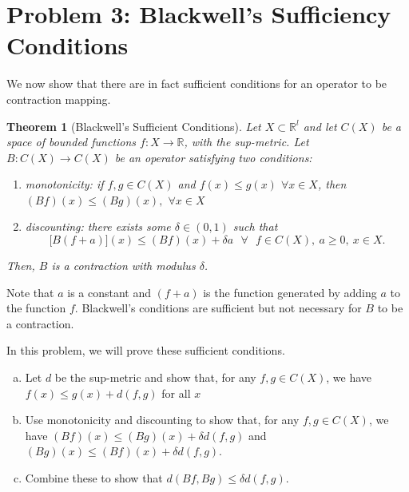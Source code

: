 \documentclass[11pt]{extarticle}
\theoremstyle{plain}
\newtheorem{thm}{Theorem}
\theoremstyle{definition}
\begin{document}
\vspace{5mm}
\section*{Problem 3: Blackwell's Sufficiency Conditions}

We now show that there are in fact sufficient conditions for an operator to be contraction mapping.

\begin{thm}[Blackwell's Sufficient Conditions]
	
	Let $X \subset \mathbb R^l$ and let $C(X)$ be a space of bounded functions $f:X \to \mathbb R$, with the sup-metric. Let $B : C(X) \to C(X)$ be an operator satisfying two conditions:
	\begin{enumerate}[1.]
		\item monotonicity: if $f,g\in C(X)$ and $f(x)\leq g(x)$ $\forall x\in X$,%
		\newline
		then $(Bf)(x)\leq (Bg)(x),$ $\forall x\in X$\newline
		
		\item discounting: there exists some $\delta \in (0,1)$ such that 
		\[
		\lbrack B(f+a)](x)\leq (Bf)(x)+\delta a\text{ \ }\forall \text{ }f\in C(X),\
		a\geq 0,\ x\in X. 
		\]%
	\end{enumerate}
	
	\noindent
	Then, $B$ is a contraction with modulus $\delta$.

\end{thm}

\noindent
Note that $a$ is a constant and $(f+a)$ is the function generated by adding $a$ to the function $f$. Blackwell's conditions are sufficient but not necessary for $B$ to be a contraction.

\vspace{5mm}
\noindent
In this problem, we will prove these sufficient conditions.
\begin{enumerate}[(a)]
\item Let $d$ be the sup-metric and show that, for any $f, g \in C(X)$, we have $f(x) \leq g(x) + d(f, g)$ for all $x$

\item Use monotonicity and discounting to show that, for any $f, g \in C(X)$, we have $(Bf)(x) \leq (Bg)(x) + \delta d(f, g)$ and $(Bg)(x) \leq (Bf)(x) + \delta d(f, g)$. 

\item Combine these to show that $d(Bf, Bg) \leq \delta d(f, g)$. 
\end{enumerate}
\end{document}
